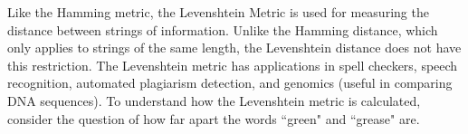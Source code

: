 \begin{comment}

\ActivitySolution

\ba

\item Since $c_2$ and $c_8$ differ only in the third and fourth components, we have that $d_H(c_2,c_8) = 2$. 

\item Suppose we receive the message 
\begin{equation} \label{eq:message}
(0,0,0,1,1,1) \ (0,0,0,1,0,0) \ (0,0,1,1,1,0) \ (0,0,0,0,1,1) \ (0,0,1,0,0,1).
\end{equation} 
	\begin{enumerate}[i.]
	\item Note that $(0,0,0,1,1,1)$, $(0,0,0,1,0,0)$, and $(0,0,1,1,1,0)$ are not in $C$. Since $C$ contains all of the possible words in our message, we know that there are errors in our message. 

	\item 
	\begin{itemize}
	\item The code words closest to $(0,0,0,1,1,1)$ are $c_2$, $c_3$, $c_5$, and $c_8$, which are all a distance $1$ from $(0,0,0,1,1,1)$. 
	\item The code words closest to $(0,0,0,1,0,0)$ are $c_1$, $c_3$, $c_5$, and $c_7$, which are all a distance $1$ from $(0,0,0,1,0,0)$.
	\item The code words closest to $(0,0,1,1,1,0)$ are $c_6$, $c_7$, and $c_8$, which are all a distance $1$ from $(0,0,1,1,1,0)$.
	\end{itemize}
	


$c_1 = (0,0,0,0,0,0)$, 	&$c_2=(0,0,0,0,1,1)$, 	&$c_3=(0,0,0,1,0,1)$, 	&$c_4=(0,0,1,0,0,1)$, \\
$c_5=(0,0,0,1,1,0)$, 		&$c_6=(0,0,1,0,1,0)$, 	&$c_7=(0,0,1,1,0,0)$, 	&$c_8=(0,0,1,1,1,1)$

	\end{enumerate}

\ea

\end{comment}



Like the Hamming metric, the Levenshtein Metric is used for measuring the distance between strings of information. Unlike the Hamming distance, which only applies to strings of the same length, the Levenshtein distance does not have this restriction. The Levenshtein metric has applications in spell checkers, speech recognition, automated plagiarism detection, and genomics (useful in comparing DNA sequences). To understand how the Levenshtein metric is calculated, consider the question of how far apart the words ``green" and ``grease" are.

